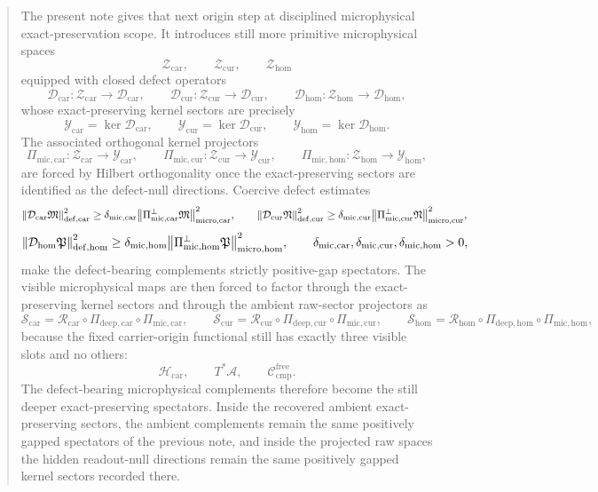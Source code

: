 \documentclass[11pt]{article}
\newcommand{\Sub}{\mathcal A}
\newcommand{\CompFree}{\mathscr C_{\mathrm{cmp}}^{\mathrm{free}}}
\newcommand{\CarrierClass}{\mathscr H_{\mathrm{car}}}
\newcommand{\CarRead}{\mathcal R_{\mathrm{car}}}
\newcommand{\CurRead}{\mathcal R_{\mathrm{cur}}}
\newcommand{\HomRead}{\mathcal R_{\mathrm{hom}}}
\newcommand{\ProtoTensorClass}{\mathscr Y_{\mathrm{car}}}
\newcommand{\ProtoRelabelClass}{\mathscr Y_{\mathrm{cur}}}
\newcommand{\ProtoFreeClass}{\mathscr Y_{\mathrm{hom}}}
\newcommand{\ProtoCarProj}{\Pi_{\mathrm{deep,car}}}
\newcommand{\ProtoCurProj}{\Pi_{\mathrm{deep,cur}}}
\newcommand{\ProtoHomProj}{\Pi_{\mathrm{deep,hom}}}
\newcommand{\UltraTensorClass}{\mathscr Z_{\mathrm{car}}}
\newcommand{\UltraRelabelClass}{\mathscr Z_{\mathrm{cur}}}
\newcommand{\UltraFreeClass}{\mathscr Z_{\mathrm{hom}}}
\newcommand{\UltraTensor}{\mathfrak M}
\newcommand{\UltraRelabel}{\mathfrak N}
\newcommand{\UltraFree}{\mathfrak P}
\newcommand{\UltraCarProj}{\Pi_{\mathrm{mic,car}}}
\newcommand{\UltraCurProj}{\Pi_{\mathrm{mic,cur}}}
\newcommand{\UltraHomProj}{\Pi_{\mathrm{mic,hom}}}
\newcommand{\UltraCarPerp}{\Pi_{\mathrm{mic,car}}^{\perp}}
\newcommand{\UltraCurPerp}{\Pi_{\mathrm{mic,cur}}^{\perp}}
\newcommand{\UltraHomPerp}{\Pi_{\mathrm{mic,hom}}^{\perp}}
\newcommand{\UltraCarGap}{\delta_{\mathrm{mic,car}}}
\newcommand{\UltraCurGap}{\delta_{\mathrm{mic,cur}}}
\newcommand{\UltraHomGap}{\delta_{\mathrm{mic,hom}}}
\newcommand{\TensorDefect}{\mathcal D_{\mathrm{car}}}
\newcommand{\CurDefect}{\mathcal D_{\mathrm{cur}}}
\newcommand{\HomDefect}{\mathcal D_{\mathrm{hom}}}
\newcommand{\UltraCarRead}{\mathcal S_{\mathrm{car}}}
\newcommand{\UltraCurRead}{\mathcal S_{\mathrm{cur}}}
\newcommand{\UltraHomRead}{\mathcal S_{\mathrm{hom}}}
\begin{document}
\begin{abstract}
The present note gives that next origin step at disciplined microphysical exact-preservation scope. It introduces still more primitive microphysical spaces
\[
\UltraTensorClass,\qquad
\UltraRelabelClass,\qquad
\UltraFreeClass
\]
equipped with closed defect operators
\[
\TensorDefect:\UltraTensorClass\to \mathscr D_{\mathrm{car}},
\qquad
\CurDefect:\UltraRelabelClass\to \mathscr D_{\mathrm{cur}},
\qquad
\HomDefect:\UltraFreeClass\to \mathscr D_{\mathrm{hom}},
\]
whose exact-preserving kernel sectors are precisely
\[
\ProtoTensorClass=\ker\TensorDefect,\qquad
\ProtoRelabelClass=\ker\CurDefect,\qquad
\ProtoFreeClass=\ker\HomDefect.
\]
The associated orthogonal kernel projectors
\[
\UltraCarProj:\UltraTensorClass\to\ProtoTensorClass,
\qquad
\UltraCurProj:\UltraRelabelClass\to\ProtoRelabelClass,
\qquad
\UltraHomProj:\UltraFreeClass\to\ProtoFreeClass,
\]
are forced by Hilbert orthogonality once the exact-preserving sectors are identified as the defect-null directions. Coercive defect estimates
\[
\norm{\TensorDefect \UltraTensor}_{\mathrm{def,car}}^2
\ge \UltraCarGap\norm{\UltraCarPerp\UltraTensor}_{\mathrm{micro,car}}^2,
\qquad
\norm{\CurDefect \UltraRelabel}_{\mathrm{def,cur}}^2
\ge \UltraCurGap\norm{\UltraCurPerp\UltraRelabel}_{\mathrm{micro,cur}}^2,
\]
\[
\norm{\HomDefect \UltraFree}_{\mathrm{def,hom}}^2
\ge \UltraHomGap\norm{\UltraHomPerp\UltraFree}_{\mathrm{micro,hom}}^2,
\qquad
\UltraCarGap,\UltraCurGap,\UltraHomGap>0,
\]
make the defect-bearing complements strictly positive-gap spectators. The visible microphysical maps are then forced to factor through the exact-preserving kernel sectors and through the ambient raw-sector projectors as
\[
\UltraCarRead=\CarRead\circ\ProtoCarProj\circ\UltraCarProj,
\qquad
\UltraCurRead=\CurRead\circ\ProtoCurProj\circ\UltraCurProj,
\qquad
\UltraHomRead=\HomRead\circ\ProtoHomProj\circ\UltraHomProj,
\]
because the fixed carrier-origin functional still has exactly three visible slots and no others:
\[
\CarrierClass,\qquad
T^*\Sub,\qquad
\CompFree.
\]
The defect-bearing microphysical complements therefore become the still deeper exact-preserving spectators. Inside the recovered ambient exact-preserving sectors, the ambient complements remain the same positively gapped spectators of the previous note, and inside the projected raw spaces the hidden readout-null directions remain the same positively gapped kernel sectors recorded there.


\end{abstract}
\end{document}
